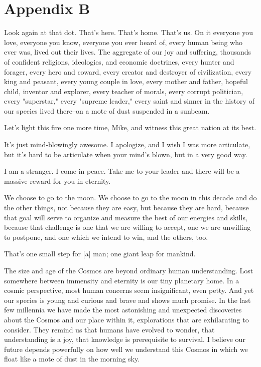 \chapter{Appendix B}
\setcounter{page}{1}
\renewcommand{\thepage}{B-\arabic{page}}

Look again at that dot. That's here. That's home. That's us. On it everyone you love, everyone you know, everyone you ever heard of, every human being who ever was, lived out their lives. The aggregate of our joy and suffering, thousands of confident religions, ideologies, and economic doctrines, every hunter and forager, every hero and coward, every creator and destroyer of civilization, every king and peasant, every young couple in love, every mother and father, hopeful child, inventor and explorer, every teacher of morals, every corrupt politician, every "superstar," every "supreme leader," every saint and sinner in the history of our species lived there--on a mote of dust suspended in a sunbeam.

Let's light this fire one more time, Mike, and witness this great nation at its best.

It's just mind-blowingly awesome. I apologize, and I wish I was more articulate, but it's hard to be articulate when your mind's blown, but in a very good way.

I am a stranger. I come in peace. Take me to your leader and there will be a massive reward for you in eternity.

We choose to go to the moon. We choose to go to the moon in this decade and do the other things, not because they are easy, but because they are hard, because that goal will serve to organize and measure the best of our energies and skills, because that challenge is one that we are willing to accept, one we are unwilling to postpone, and one which we intend to win, and the others, too.

That's one small step for [a] man; one giant leap for mankind.

The size and age of the Cosmos are beyond ordinary human understanding. Lost somewhere between immensity and eternity is our tiny planetary home. In a cosmic perspective, most human concerns seem insignificant, even petty. And yet our species is young and curious and brave and shows much promise. In the last few millennia we have made the most astonishing and unexpected discoveries about the Cosmos and our place within it, explorations that are exhilarating to consider. They remind us that humans have evolved to wonder, that understanding is a joy, that knowledge is prerequisite to survival. I believe our future depends powerfully on how well we understand this Cosmos in which we float like a mote of dust in the morning sky.

